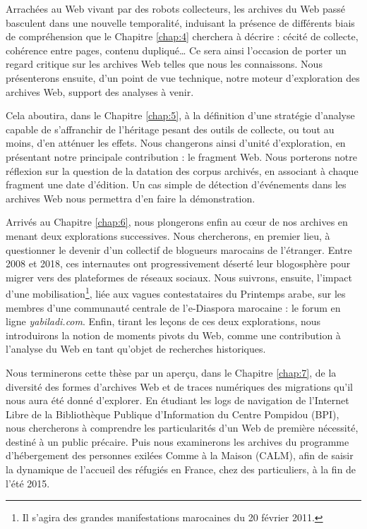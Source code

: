 \documentclass[symmetric,justified,marginals=raggedouter]{tufte-book}
\begin{document}
Arrachées au Web vivant par des robots collecteurs, les archives du Web passé basculent dans une nouvelle temporalité, induisant la présence de différents biais de compréhension que le Chapitre \ref{chap:4} cherchera à décrire : cécité de collecte, cohérence entre pages, contenu dupliqué\ldots{} Ce sera ainsi l'occasion de porter un regard critique sur les archives Web telles que nous les connaissons. Nous présenterons ensuite, d'un point de vue technique, notre moteur d'exploration des archives Web, support des analyses à venir. 

Cela aboutira, dans le Chapitre \ref{chap:5}, à la définition d'une stratégie d'analyse capable de s'affranchir de l'héritage pesant des outils de collecte, ou tout au moins, d'en atténuer les effets. Nous changerons ainsi d'unité d'exploration, en présentant notre principale contribution : le fragment Web. Nous porterons notre réflexion sur la question de la datation des corpus archivés, en associant à chaque fragment une date d'édition. Un cas simple de détection d'événements dans les archives Web nous permettra d'en faire la démonstration.

Arrivés au Chapitre \ref{chap:6}, nous plongerons enfin au cœur de nos archives en menant deux explorations successives. Nous chercherons, en premier lieu, à questionner le devenir d'un collectif de blogueurs marocains de l'étranger. Entre 2008 et 2018, ces internautes ont progressivement déserté leur blogosphère pour migrer vers des plateformes de réseaux sociaux. Nous suivrons, ensuite, l'impact d'une mobilisation\footnote{\RaggedOuter Il s'agira des grandes manifestations marocaines du 20 février 2011.}, liée aux vagues contestataires du Printemps arabe, sur les membres d'une communauté centrale de l'e-Diaspora marocaine : le forum en ligne \textit{yabiladi.com}. Enfin, tirant les leçons de ces deux explorations, nous introduirons la notion de moments pivots du Web, comme une contribution à l'analyse du Web en tant qu'objet de recherches historiques. 

Nous terminerons cette thèse par un aperçu, dans le Chapitre \ref{chap:7}, de la diversité des formes d'archives Web et de traces numériques des migrations qu'il nous aura été donné d'explorer. En étudiant les logs de navigation de l'Internet Libre de la Bibliothèque Publique d'Information du Centre Pompidou (BPI), nous chercherons à comprendre les particularités d'un Web de première nécessité, destiné à un public précaire. Puis nous examinerons les archives du programme d'hébergement des personnes exilées Comme à la Maison (CALM), afin de saisir la dynamique de l'accueil des réfugiés en France, chez des particuliers, à la fin de l'été 2015.
\end{document}
